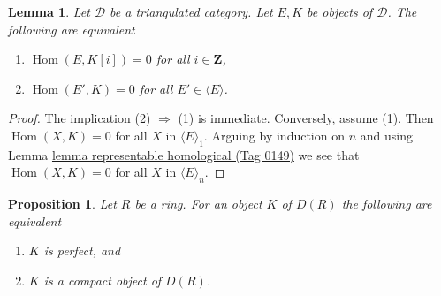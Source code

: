 \documentclass{amsart}
\theoremstyle{plain}
\newtheorem{proposition}[subsection]{Proposition}
\newtheorem{lemma}[subsection]{Lemma}
\theoremstyle{definition}
\theoremstyle{remark}
\numberwithin{equation}{subsection}
\def\Hom{\mathop{\mathrm{Hom}}\nolimits}
\begin{document}
\begin{lemma}
\label{derived-lemma-right-orthogonal}
Let $\mathcal{D}$ be a triangulated category. Let $E, K$ be objects
of $\mathcal{D}$. The following are equivalent
\begin{enumerate}
\item $\Hom(E, K[i]) = 0$ for all $i \in \mathbf{Z}$,
\item $\Hom(E', K) = 0$ for all $E' \in \langle E \rangle$.
\end{enumerate}
\end{lemma}

\begin{proof}
The implication (2) $\Rightarrow$ (1) is immediate. Conversely,
assume (1). Then $\Hom(X, K) = 0$ for all $X$ in $\langle E \rangle_1$.
Arguing by induction on $n$ and using
Lemma \href{https://stacks.math.columbia.edu/tag/0149}{lemma representable homological (Tag 0149)}
we see that $\Hom(X, K) = 0$ for all $X$
in $\langle E \rangle_n$.
\end{proof}


\begin{proposition}
\label{more-algebra-proposition-perfect-is-compact}
Let $R$ be a ring. For an object $K$ of $D(R)$ the following are equivalent
\begin{enumerate}
\item $K$ is perfect, and
\item $K$ is a compact object of $D(R)$.
\end{enumerate}
\end{proposition}
\end{document}
